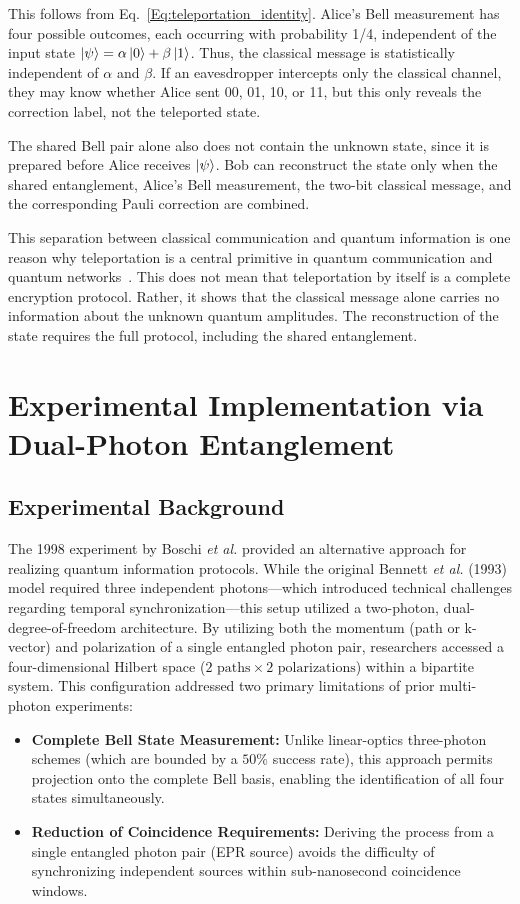 \documentclass[aps,prd,preprint,floats,epsf,superscriptaddress,nofootinbib]{revtex4}
\begin{document}
This follows from Eq.~\ref{Eq:teleportation_identity}. Alice's Bell measurement has four possible outcomes, each occurring with probability 1/4, independent of the input state $\ket{\psi}=\alpha\ket{0}+\beta\ket{1}$. Thus, the classical message is statistically independent of $\alpha$ and $\beta$. If an eavesdropper intercepts only the classical channel, they may know whether Alice sent 00, 01, 10, or 11, but this only reveals the correction label, not the teleported state.

The shared Bell pair alone also does not contain the unknown state, since it is prepared before Alice receives $\ket{\psi}$. Bob can reconstruct the state only when the shared entanglement, Alice's Bell measurement, the two-bit classical message, and the corresponding Pauli correction are combined.

This separation between classical communication and quantum information is one reason why teleportation is a central primitive in quantum communication and quantum networks~\cite{Pirandola2015}. This does not mean that teleportation by itself is a complete encryption protocol. Rather, it shows that the classical message alone carries no information about the unknown quantum amplitudes. The reconstruction of the state requires the full protocol, including the shared entanglement.
\newpage
\section{Experimental Implementation via Dual-Photon Entanglement}

\subsection{Experimental Background}
The 1998 experiment by Boschi \textit{et al.} provided an alternative approach for realizing quantum information protocols. While the original Bennett \textit{et al.} (1993) model required three independent photons---which introduced technical challenges regarding temporal synchronization---this setup utilized a two-photon, dual-degree-of-freedom architecture. By utilizing both the momentum (path or k-vector) and polarization of a single entangled photon pair, researchers accessed a four-dimensional Hilbert space ($2 \text{ paths} \times 2 \text{ polarizations}$) within a bipartite system. This configuration addressed two primary limitations of prior multi-photon experiments:

\begin{itemize}
    \item \textbf{Complete Bell State Measurement:} Unlike linear-optics three-photon schemes (which are bounded by a $50\%$ success rate), this approach permits projection onto the complete Bell basis, enabling the identification of all four states simultaneously.
    \item \textbf{Reduction of Coincidence Requirements:} Deriving the process from a single entangled photon pair (EPR source) avoids the difficulty of synchronizing independent sources within sub-nanosecond coincidence windows.
\end{itemize}
\end{document}
